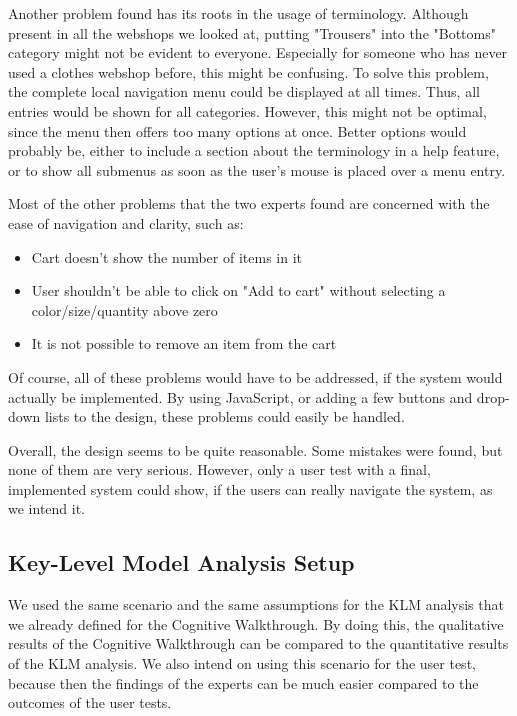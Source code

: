 Another problem found has its roots in the usage of terminology. Although present in all the webshops we looked at, putting "Trousers" into the "Bottoms" category might not be evident to everyone. Especially for someone who has never used a clothes webshop before, this might be confusing. To solve this problem, the complete local navigation menu could be displayed at all times. Thus, all entries would be shown for all categories. However, this might not be optimal, since the menu then offers too many options at once. Better options would probably be, either to include a section about the terminology in a help feature, or to show all submenus as soon as the user's mouse is placed over a menu entry.

Most of the other problems that the two experts found are concerned with the ease of navigation and clarity, such as:
\begin{itemize}\addtolength{\itemsep}{-0.5\baselineskip}
	\item Cart doesn't show the number of items in it
	\item User shouldn't be able to click on "Add to cart" without selecting a color/size/quantity above zero
	\item It is not possible to remove an item from the cart
\end{itemize}
Of course, all of these problems would have to be addressed, if the system would actually be implemented. By using JavaScript, or adding a few buttons and drop-down lists to the design, these problems could easily be handled.

Overall, the design seems to be quite reasonable. Some mistakes were found, but none of them are very serious. However, only a user test with a final, implemented system could show, if the users can really navigate the system, as we intend it.

\subsection{Key-Level Model Analysis Setup}
We used the same scenario and the same assumptions for the KLM analysis that we already defined for the Cognitive Walkthrough. By doing this, the qualitative results of the Cognitive Walkthrough can be compared to the quantitative results of the KLM analysis. We also intend on using this scenario for the user test, because then the findings of the experts can be much easier compared to the outcomes of the user tests.

